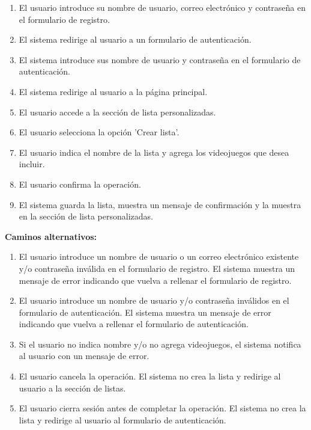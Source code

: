 \begin{description}
    \begin{enumerate}
            \item El usuario introduce su nombre de usuario, correo electrónico y contraseña en el formulario de registro.
            \item El sistema redirige al usuario a un formulario de autenticación. 
            \item El sistema introduce sus nombre de usuario y contraseña en el formulario de autenticación.
            \item El sistema redirige al usuario a la página principal.
            \item El usuario accede a la sección de lista personalizadas.
            \item El usuario selecciona la opción 'Crear lista'.
            \item El usuario indica el nombre de la lista y agrega los videojuegos que desea incluir.
            \item El usuario confirma la operación.
            \item El sistema guarda la lista, muestra un mensaje de confirmación y la muestra en la sección de lista personalizadas.
    \end{enumerate}
    \item \textbf{Caminos alternativos:}
    \begin{enumerate}
        \item El usuario introduce un nombre de usuario o un correo electrónico existente y/o contraseña inválida en el formulario de registro. El sistema muestra un mensaje de error indicando 
            que vuelva a rellenar el formulario de registro.
        \item El usuario introduce un nombre de usuario y/o contraseña inválidos en el formulario de autenticación. El sistema muestra un mensaje de error indicando 
        que vuelva a rellenar el formulario de autenticación.
        \item Si el usuario no indica nombre y/o no agrega videojuegos, el sistema notifica al usuario con un mensaje de error.
        \item El usuario cancela la operación. El sistema no crea la lista y redirige al usuario a la sección de listas.
        \item El usuario cierra sesión antes de completar la operación. El sistema no crea la lista y redirige al usuario al formulario de autenticación.
    \end{enumerate}
\end{description}

